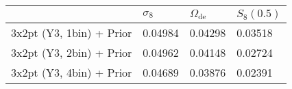 \begin{tabular}{llll}
\toprule
{} & $\sigma_8$ & $\Omega_\mathrm{de}$ & $S_8(0.5)$ \\
\midrule
3x2pt (Y3, 1bin) + Prior &    0.04984 &              0.04298 &    0.03518 \\
3x2pt (Y3, 2bin) + Prior &    0.04962 &              0.04148 &    0.02724 \\
3x2pt (Y3, 4bin) + Prior &    0.04689 &              0.03876 &    0.02391 \\
\bottomrule
\end{tabular}
